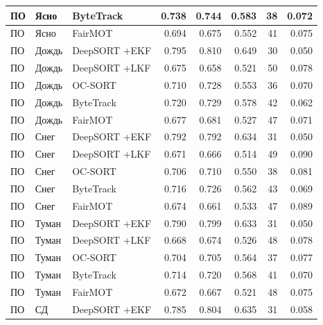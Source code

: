 \begin{longtable}{|p{2.42cm}|p{1.8cm}|p{2.4cm}|r|r|r|r|r|}
       ПО     &      Ясно &    ByteTrack & 0.738 & 0.744 & 0.583 &   38 & 0.072                        \\ \hline
       ПО     &      Ясно &      FairMOT & 0.694 & 0.675 & 0.552 &   41 & 0.075                        \\ \hline
       ПО     &      Дождь & DeepSORT +EKF & 0.795 & 0.810 & 0.649 &   30 & 0.050                     \\ \hline
       ПО     &      Дождь & DeepSORT +LKF & 0.675 & 0.658 & 0.521 &   50 & 0.078                     \\ \hline
       ПО     &      Дождь &      OC-SORT & 0.710 & 0.728 & 0.553 &   36 & 0.070                      \\ \hline
       ПО     &      Дождь &    ByteTrack & 0.720 & 0.729 & 0.578 &   42 & 0.062                      \\ \hline
       ПО     &      Дождь &      FairMOT & 0.677 & 0.681 & 0.527 &   47 & 0.071                      \\ \hline
       ПО     &      Снег & DeepSORT +EKF & 0.792 & 0.792 & 0.634 &   31 & 0.050                      \\ \hline
       ПО     &      Снег & DeepSORT +LKF & 0.671 & 0.666 & 0.514 &   49 & 0.090                      \\ \hline
       ПО     &      Снег &      OC-SORT & 0.706 & 0.710 & 0.550 &   38 & 0.081                       \\ \hline
       ПО     &      Снег &    ByteTrack & 0.716 & 0.726 & 0.562 &   43 & 0.069                       \\ \hline
       ПО     &      Снег &      FairMOT & 0.674 & 0.661 & 0.533 &   47 & 0.089                       \\ \hline
       ПО     &      Туман & DeepSORT +EKF & 0.790 & 0.799 & 0.633 &   31 & 0.050                    \\ \hline
       ПО     &      Туман & DeepSORT +LKF & 0.668 & 0.674 & 0.526 &   48 & 0.078                    \\ \hline
       ПО     &      Туман &      OC-SORT & 0.704 & 0.705 & 0.564 &   37 & 0.077                     \\ \hline
       ПО     &      Туман &    ByteTrack & 0.714 & 0.720 & 0.568 &   41 & 0.070                     \\ \hline
       ПО     &      Туман &      FairMOT & 0.672 & 0.667 & 0.521 &   48 & 0.075                     \\ \hline
       ПО     &      СД & DeepSORT +EKF & 0.785 & 0.804 & 0.635 &   31 & 0.058                              \\ \hline

\end{longtable}
